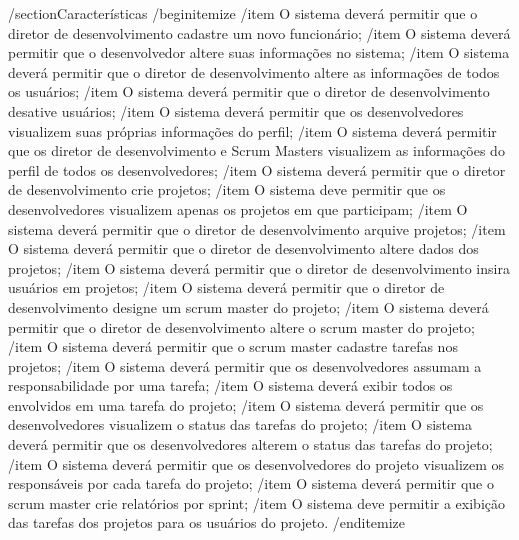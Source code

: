 /section{Características}
    /begin{itemize}
        /item O sistema deverá permitir que o diretor de desenvolvimento cadastre um novo funcionário;
        /item O sistema deverá permitir que o desenvolvedor altere suas informações no sistema;
        /item O sistema deverá permitir que o diretor de desenvolvimento altere as informações de todos os usuários;
        /item O sistema deverá permitir que o diretor de desenvolvimento desative usuários;
        /item O sistema deverá permitir que os desenvolvedores visualizem suas próprias informações do perfil;
        /item O sistema deverá permitir que os diretor de desenvolvimento e Scrum Masters visualizem as informações do perfil de todos os desenvolvedores;
        /item O sistema deverá permitir que o diretor de desenvolvimento crie projetos;
        /item O sistema deve permitir que os desenvolvedores visualizem apenas os projetos em que participam;
        /item O sistema deverá permitir que o  diretor de desenvolvimento  arquive projetos;
        /item O sistema deverá permitir que o diretor de desenvolvimento  altere dados dos projetos;
        /item O sistema deverá permitir que o diretor de desenvolvimento insira usuários em projetos;
        /item O sistema deverá permitir que o diretor de desenvolvimento designe um scrum master do projeto;
        /item O sistema deverá permitir que o  diretor de desenvolvimento altere o scrum master do projeto;
        /item O sistema deverá permitir que o  scrum master cadastre tarefas nos projetos;
        /item O sistema deverá permitir que os desenvolvedores assumam a responsabilidade por uma tarefa;
        /item O sistema deverá exibir todos os envolvidos em uma tarefa do projeto;
        /item O sistema deverá permitir que os desenvolvedores  visualizem o status das tarefas do projeto;
        /item O sistema deverá permitir que os desenvolvedores alterem o status das tarefas do projeto;
        /item O sistema deverá permitir que os desenvolvedores do projeto  visualizem os responsáveis por cada tarefa do projeto;
        /item O sistema deverá permitir que o scrum master crie relatórios por sprint;
        /item O sistema deve permitir a exibição das tarefas dos projetos para os usuários do projeto.
    /end{itemize}
    
